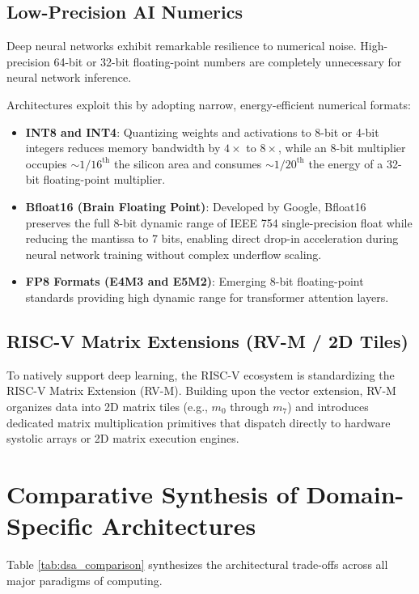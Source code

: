 \subsection{Low-Precision AI Numerics}
Deep neural networks exhibit remarkable resilience to numerical noise. High-precision 64-bit or 32-bit floating-point numbers are completely unnecessary for neural network inference.

Architectures exploit this by adopting narrow, energy-efficient numerical formats:
\begin{itemize}
    \item \textbf{INT8 and INT4}: Quantizing weights and activations to 8-bit or 4-bit integers reduces memory bandwidth by $4\times$ to $8\times$, while an 8-bit multiplier occupies $\sim 1/16^{\text{th}}$ the silicon area and consumes $\sim 1/20^{\text{th}}$ the energy of a 32-bit floating-point multiplier.
    \item \textbf{Bfloat16 (Brain Floating Point)}: Developed by Google, Bfloat16 preserves the full 8-bit dynamic range of IEEE 754 single-precision float while reducing the mantissa to 7 bits, enabling direct drop-in acceleration during neural network training without complex underflow scaling.
    \item \textbf{FP8 Formats (E4M3 and E5M2)}: Emerging 8-bit floating-point standards providing high dynamic range for transformer attention layers.
\end{itemize}

\subsection{RISC-V Matrix Extensions (RV-M / 2D Tiles)}
To natively support deep learning, the RISC-V ecosystem is standardizing the RISC-V Matrix Extension (RV-M). Building upon the vector extension, RV-M organizes data into 2D matrix tiles (e.g., $m_0$ through $m_7$) and introduces dedicated matrix multiplication primitives that dispatch directly to hardware systolic arrays or 2D matrix execution engines.


\section{Comparative Synthesis of Domain-Specific Architectures}\label{sec:dsa_comparison}

Table \ref{tab:dsa_comparison} synthesizes the architectural trade-offs across all major paradigms of computing.

